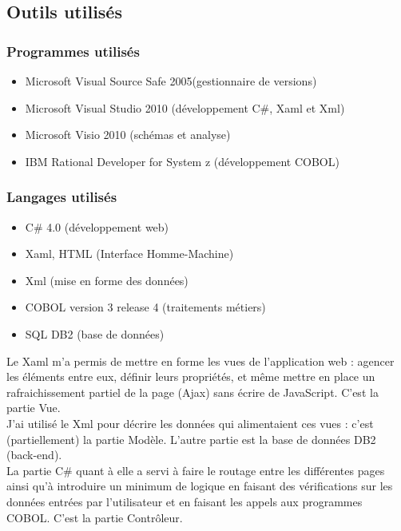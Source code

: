 \documentclass[a4paper,french,12pt]{article}
\begin{document}
	\subsection{Outils utilisés}
	
		\subsubsection{Programmes utilisés}
		
			\begin{itemize}
				\item Microsoft Visual Source Safe 2005(gestionnaire de versions)
				\item Microsoft Visual Studio 2010 (développement C\#, Xaml et Xml)
				\item Microsoft Visio 2010 (schémas et analyse)
				\item IBM Rational Developer for System z (développement COBOL)
			\end{itemize}
		
		\subsubsection{Langages utilisés}
			
			\begin{itemize}
				\item C\# 4.0 (développement web)
				\item Xaml, HTML (Interface Homme-Machine)
				\item Xml (mise en forme des données)
				\item COBOL version 3 release 4 (traitements métiers)
				\item SQL DB2 (base de données)
			\end{itemize}
			
			Le Xaml m’a permis de mettre en forme les vues de l’application web : agencer les éléments entre eux, définir leurs propriétés,
			et même mettre en place un rafraichissement partiel de la page (Ajax) sans écrire de JavaScript. C’est la partie Vue.\\
			J’ai utilisé le Xml pour décrire les données qui alimentaient ces vues : c’est (partiellement) la partie Modèle. L’autre partie est la base de données DB2 (back-end).\\
			La partie C\# quant à elle a servi à faire le routage entre les différentes pages ainsi qu’à introduire un minimum de logique en faisant des vérifications sur les données entrées par l'utilisateur 
			et en faisant les appels aux programmes COBOL. C’est la partie Contrôleur.\\ 
						
\end{document}
